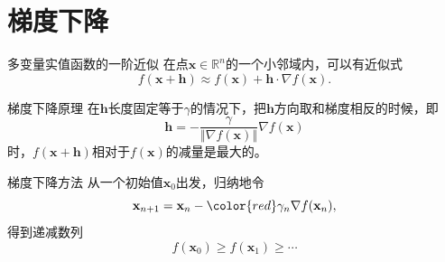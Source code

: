
\section{梯度下降}


\begin{frame}

\begin{block}{多变量实值函数的一阶近似}
在点$\mathbf{x} \in \mathbb{R}^n$的一个小邻域内，可以有近似式
\[f(\mathbf{x} + \mathbf{h}) \approx f(\mathbf{x}) + \mathbf{h}\cdot\nabla f(\mathbf{x}).\]
\end{block}

\pause

\begin{block}{梯度下降原理}
在$\mathbf{h}$长度固定等于$\gamma$的情况下，把$\mathbf{h}$方向取和梯度相反的时候，即
\[\mathbf{h} = -\dfrac{\gamma}{\left\Vert \nabla f(\mathbf{x}) \right\Vert} \nabla f(\mathbf{x})\]
时，$f(\mathbf{x} + \mathbf{h})$相对于$f(\mathbf{x})$的减量是最大的。
\end{block}

\end{frame}


\begin{frame}

\begin{block}{梯度下降方法}
从一个初始值$\mathbf{x}_0$出发，归纳地令
\[\mathbf{x}_{n+1} = \mathbf{x}_n - {\color{red}\gamma_n} \nabla f(\mathbf{x}_n),\]
得到递减数列
\[f(\mathbf{x}_0) \geqslant f(\mathbf{x}_1) \geqslant \cdots\]
\end{block}

\end{frame}








